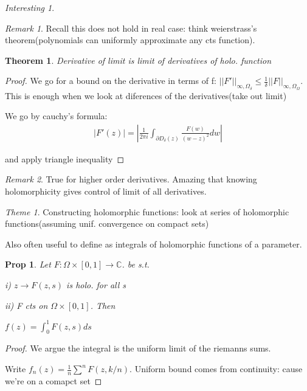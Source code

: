 \documentclass[11pt]{article}
\newcommand{\C}{\mathbb{C}}
\newtheorem{theorem}{Theorem}
\newtheorem{prop}{Prop}
\theoremstyle{remark}
\newtheorem{remark}{Remark}
\newtheorem{interest}{Interesting}
\newtheorem{theme}{Theme}
\begin{document}
\begin{interest}
\begin{remark}
	Recall this does not hold in real case: think weierstrass's theorem(polynomials can uniformly approximate any cts function).
\end{remark}

\begin{theorem}
	Derivative of limit is limit of derivatives of holo. function
\end{theorem}

\begin{proof}
	We go for a bound on the derivative in terms of f: $||F'||_{\infty,\Omega_{\delta}} \leq \frac{1}{\delta}||F||_{\infty,\Omega_{\Omega}}$. This is enough when we look at diferences of the derivatives(take out limit)

	We go by cauchy's formula:
	\begin{align*}
		|F'(z)| = |\frac{1}{2\pi i}\int_{\partial D_{\delta}(z)}\frac{F(w)}{(w-z)^2}dw|
	\end{align*}

	and apply triangle inequality
\end{proof}

\begin{remark}
	True for higher order derivatives. Amazing that knowing holomorphicity gives control of limit of all derivatives. 
\end{remark}

\begin{theme}
	Constructing holomorphic functions: look at series of holomorphic functions(assuming unif. convergence on compact sets)

	Also often useful to define as integrals of holomorphic functions of a parameter.
\end{theme}

\begin{prop}
	Let $F : \Omega \times [0,1] \to \C$. be s.t. 

	i) $z \to F(z,s)$ is holo. for all s

	ii) F cts on $\Omega \times [0,1]$. Then 

	$f(z) = \int_0^1 F(z,s) ds $
\end{prop}

\begin{proof}
	We argue the integral is the uniform limit of the riemanns sums. 

	Write $f_n(z) = \frac{1}{n}\sum^n F(z,k/n)$. Uniform bound comes from continuity: cause we're on a comapct set
\end{proof}


\end{interest}
\end{document}
